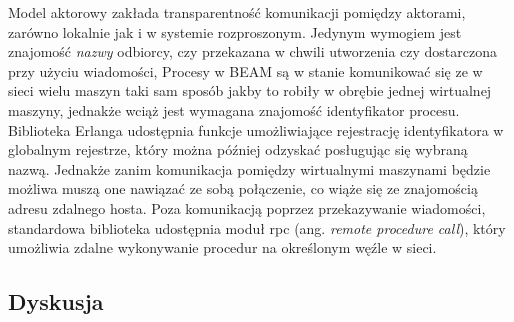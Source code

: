 \documentclass[12pt,twoside]{article}
\begin{document}
Model aktorowy zakłada transparentność komunikacji pomiędzy aktorami,
zarówno lokalnie jak i w systemie rozproszonym. Jedynym wymogiem jest
znajomość \emph{nazwy} odbiorcy, czy przekazana w chwili utworzenia czy
dostarczona przy użyciu wiadomości, Procesy w BEAM są w stanie
komunikować się ze w sieci wielu maszyn taki sam sposób jakby to robiły
w obrębie jednej wirtualnej maszyny, jednakże wciąż jest wymagana
znajomość identyfikator procesu. Biblioteka Erlanga udostępnia funkcje
umożliwiające rejestrację identyfikatora w globalnym rejestrze, który
można później odzyskać posługując się wybraną nazwą. Jednakże zanim
komunikacja pomiędzy wirtualnymi maszynami będzie możliwa muszą one
nawiązać ze sobą połączenie, co wiąże się ze znajomością adresu zdalnego
hosta. Poza komunikacją poprzez przekazywanie wiadomości, standardowa
biblioteka udostępnia moduł rpc (ang. \emph{remote procedure call}),
który umożliwia zdalne wykonywanie procedur na określonym węźle w sieci.

\subsection{Dyskusja}\label{dyskusja}
\end{document}
